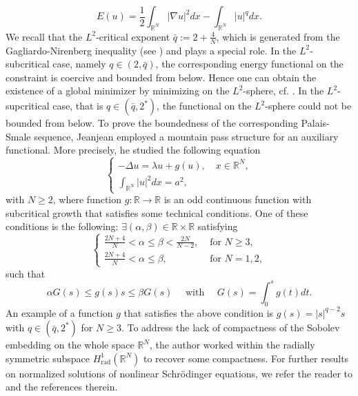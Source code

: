 \documentclass[11pt]{amsart}
\numberwithin{equation}{section}
\begin{document}
{\begin{equation}\label{Eq-Eu}
E(u)=\frac{1}{2} \int_{\mathbb{R}^N}|\nabla u|^2d x-\int_{\mathbb{R}^N} |u|^qd x.
\end{equation}
We recall that the $L^2$-critical exponent
$\bar{q}:= 2 + \frac{4}{N}$, which is generated from the Gagliardo-Nirenberg inequality (see \cite{Cazenave}) and plays a special role.
In the $L^2$-subcritical case, namely $q\in(2,\bar{q})$, the corresponding energy functional on the constraint is coercive and bounded from below. Hence one can obtain the existence of a global minimizer by minimizing on the $L^2$-sphere, {cf.} \cite{Shibata}. In the $L^2$-supcritical case, that is $q\in(\bar{q},2^*)$, the functional on the $L^2$-sphere could not be bounded from below. {To prove the boundedness of the corresponding Palais-Smale sequence,} Jeanjean \cite{Jean} employed a mountain pass structure for an auxiliary functional. More precisely, he studied the following equation
$$
\left\{\begin{array}{l}
    -\Delta u=\lambda u+g(u), \quad x\in \mathbb{R}^N, \\[5pt]
\displaystyle   \int_{\mathbb{R}^N}|u|^2 d x=a^2,
\end{array}\right.
$$
with $N \geq 2$, where function $g: \mathbb{R} \rightarrow \mathbb{R}$ is an odd continuous function with subcritical growth that satisfies some technical conditions. One of these conditions is the following: $\exists(\alpha, \beta) \in \mathbb{R} \times \mathbb{R}$ satisfying
$$
\begin{cases}\frac{2 N+4}{N}<\alpha \leq \beta<\frac{2 N}{N-2}, & \text { for } N \geq 3, \\ \frac{2 N+4}{N}<\alpha \leq \beta, & \text { for } N=1,2,\end{cases}
$$
such that
$$
\alpha G(s) \leq g(s) s \leq \beta G(s) \quad \text { with } \quad G(s)=\int_0^s g(t) d t.
$$
An example of a function $g$ that satisfies the above condition is $g(s)=|s|^{q-2} s$ with $q \in\left(\bar{q}, 2^*\right)$ for $N \geq 3$. To address the lack of compactness of the Sobolev embedding on the whole space $\mathbb{R}^N$, the author worked within the radially symmetric subspace $H_{\text{rad}}^1\left(\mathbb{R}^N\right)$ to recover some compactness. For further results on normalized solutions of nonlinear Schr\"{o}dinger equations, we refer the reader to \cite{A21, AS2, CCM, AJ21, AlvesThin, Bartschmolle, BartschSaove,ThomaseNicola, valerio, Bartosz, BellazziniJeanjeanLuo, Cazenave, Jun, JeanjeanJendrejLeVisciglia, JeanjeanLu, JeanjeanLu2020,JeanjenaLu2, JeanjeanLe, Nicola1} and the references therein.


}
\end{document}
